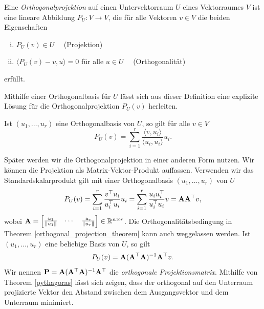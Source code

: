 \begin{defn}
Eine \textit{Orthogonalprojektion} auf einen Untervektorraum $U$ eines Vektorraumes $V$ ist eine lineare Abbildung $P_U \colon V \rightarrow V$, die für alle Vektoren $v \in V$ die beiden Eigenschaften
\begin{enumerate}[(i)]
\item $P_U(v) \in U \quad$ (Projektion)
\item $\langle P_U(v) - v , u \rangle = 0$ für alle $u \in U \quad$ (Orthogonalität)
\end{enumerate}
erfüllt.
\end{defn}

Mithilfe einer Orthogonalbasis für $U$ lässt sich aus dieser Definition eine explizite Lösung für die Orthogonalprojektion $P_U(v)$ herleiten.

\begin{thm}
\label{orthogonal_projection_theorem}
Ist $(u_1, \ldots, u_r)$ eine Orthogonalbasis von $U$, so gilt für alle $v \in V$
$$P_{U}(v) = \sum_{i=1}^r \frac{\langle v, u_i \rangle}{\langle u_i, u_i \rangle} u_i.$$
\end{thm}

Später werden wir die Orthogonalprojektion in einer anderen Form nutzen. Wir können die Projektion als Matrix-Vektor-Produkt auffassen. Verwenden wir das Standardskalarprodukt gilt mit einer Orthogonalbasis $(u_1, \ldots, u_r)$ von $U$
\begin{align}
P_U(v) = \sum_{i=1}^r \frac{v^{\top} u_i}{u_i^{\top} u_i} u_i = \sum_{i=1}^r \frac{u_i u_i^{\top}}{u_i^{\top} u_i}v = \mathbf{A} \mathbf{A}^{\top} v,
\end{align}
wobei $\mathbf{A} = \begin{bmatrix} \frac{u_1}{\left\lVert u_1 \right\rVert} & \cdots & \frac{u_r}{\left\lVert u_r \right\rVert} \end{bmatrix} \in \mathbb{R}^{n \times r}$. Die Orthogonalitätsbedingung in Theorem \ref{orthogonal_projection_theorem} kann auch weggelassen werden. Ist $(u_{1},\ldots ,u_{r})$ eine beliebige Basis von $U$, so gilt
\begin{align}
P_U(v) = \mathbf{A} (\mathbf{A}^\top \mathbf{A})^{-1} \mathbf{A}^\top v.
\end{align}
Wir nennen $\mathbf{P} = \mathbf{A} (\mathbf{A}^\top \mathbf{A})^{-1} \mathbf{A}^\top$ die \textit{orthogonale Projektionsmatrix}. Mithilfe von Theorem \ref{pythagoras} lässt sich zeigen, dass der orthogonal auf den Unterraum projizierte Vektor den Abstand zwischen dem Ausgangsvektor und dem Unterraum minimiert.

